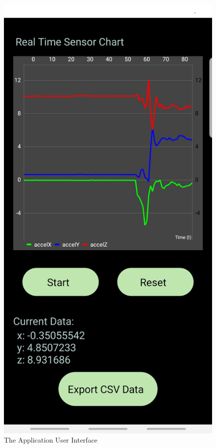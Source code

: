 \documentclass{article}
\begin{document}
\begin{figure}[H]
\centering
\includegraphics[scale= .1]{application.jpg}
\caption{The Application User Interface}
\label{fig:application} 
\end{figure}
\end{document}
